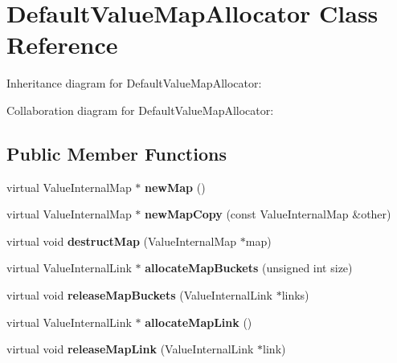\hypertarget{class_default_value_map_allocator}{\section{Default\+Value\+Map\+Allocator Class Reference}
\label{class_default_value_map_allocator}
}


Inheritance diagram for Default\+Value\+Map\+Allocator\+:


Collaboration diagram for Default\+Value\+Map\+Allocator\+:
\subsection*{Public Member Functions}
\begin{DoxyCompactItemize}
\item 
\hypertarget{class_default_value_map_allocator_af58f1000da938b453f499270642db381}{virtual Value\+Internal\+Map $\ast$ {\bfseries new\+Map} ()}\label{class_default_value_map_allocator_af58f1000da938b453f499270642db381}

\item 
\hypertarget{class_default_value_map_allocator_a4edf94de1fe95c7722421694c3ac101f}{virtual Value\+Internal\+Map $\ast$ {\bfseries new\+Map\+Copy} (const Value\+Internal\+Map \&other)}\label{class_default_value_map_allocator_a4edf94de1fe95c7722421694c3ac101f}

\item 
\hypertarget{class_default_value_map_allocator_aa37cddbdf061065dbe6cb12e9de5ac08}{virtual void {\bfseries destruct\+Map} (Value\+Internal\+Map $\ast$map)}\label{class_default_value_map_allocator_aa37cddbdf061065dbe6cb12e9de5ac08}

\item 
\hypertarget{class_default_value_map_allocator_a1dc9a181273b90fa7098313316c53fcf}{virtual Value\+Internal\+Link $\ast$ {\bfseries allocate\+Map\+Buckets} (unsigned int size)}\label{class_default_value_map_allocator_a1dc9a181273b90fa7098313316c53fcf}

\item 
\hypertarget{class_default_value_map_allocator_a45a33b35da50dc69c47dfd31e49c1b0e}{virtual void {\bfseries release\+Map\+Buckets} (Value\+Internal\+Link $\ast$links)}\label{class_default_value_map_allocator_a45a33b35da50dc69c47dfd31e49c1b0e}

\item 
\hypertarget{class_default_value_map_allocator_acc658ce4f2d738fd4db6222c8f89defd}{virtual Value\+Internal\+Link $\ast$ {\bfseries allocate\+Map\+Link} ()}\label{class_default_value_map_allocator_acc658ce4f2d738fd4db6222c8f89defd}

\item 
\hypertarget{class_default_value_map_allocator_ad6998891b5b25c53d28055eed8e4a355}{virtual void {\bfseries release\+Map\+Link} (Value\+Internal\+Link $\ast$link)}\label{class_default_value_map_allocator_ad6998891b5b25c53d28055eed8e4a355}

\end{DoxyCompactItemize}



